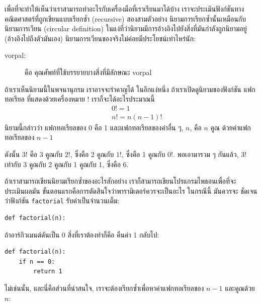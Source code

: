 เพื่อที่จะทำให้เห็นว่าเราสามารถทำอะไรกับเครื่องมือที่เราเรียนมาได้บ้าง เราจะประเมินฟังก์ชันทาง
คณิตศาสตร์ที่ถูกเขียนแบบเรียกซ้ำ (recursive) สองสามตัวอย่าง นิยามการเรียกซ้ำนั้นเหมือนกับ
นิยามการเวียน (circular definition) ในแง่ที่ว่านิยามมีการอ้างอิงไปยังสิ่งที่มันกำลังถูกนิยามอยู่ 
(อ้างอิงไปถึงตัวมันเอง)  นิยามการเวียนของจริงไม่ค่อยมีประโยชน์เท่าไหร่นัก:

\begin{description}

\item[vorpal:] คือ คุณศัพท์ที่ใช้บรรยายบางสิ่งที่มีลักษณะ vorpal 

\end{description}

ถ้าเราเห็นนิยามนี้ในพจนานุกรม เราอาจจะรำคาญได้  ในอีกแง่หนึ่ง ถ้าเราเปิดดูนิยามของฟังก์ชัน
แฟกทอเรียล ที่แสดงด้วยเครื่องหมาย $!$ เราก็จะได้อะไรประมาณนี้
%
\begin{eqnarray*}
&&  0! = 1 \\
&&  n! = n (n-1)!
\end{eqnarray*}
%
นิยามนี้กล่าวว่า แฟกทอเรียลของ 0 คือ 1 และแฟกทอเรียลของค่าอื่น ๆ, $n$, คือ $n$ คูณ
ด้วยค่าแฟกทอเรียลของ $n-1$

ดังนั้น $3!$ คือ 3 คูณกับ $2!$, ซึ่งคือ 2 คูณกับ $1!$, ซึ่งคือ 1 คูณกับ
$0!$. พอเอามารวม ๆ กันแล้ว, $3!$ เท่ากับ 3 คูณกับ 2 คูณกับ 1 คูณกับ 1,
ซึ่งคือ 6.

ถ้าเราสามารถเขียนนิยามเรียกซ้ำของอะไรสักอย่าง เราก็สามารถเขียนโปรแกรมไพธอนเพื่อที่จะ
ประเมินผลมัน ขั้นตอนแรกคือการตัดสินใจว่าพารามิเตอร์ควรจะเป็นอะไร ในกรณีนี้ มันควรจะ
ชัดเจนว่าฟังก์ชัน {\tt factorial} รับค่าเป็นจำนวนเต็ม:

\begin{verbatim}
def factorial(n):
\end{verbatim}
%
ถ้าอาร์กิวเมนต์ดันเป็น 0 สิ่งที่เราต้องทำก็คือ คืนค่า 1 กลับไป:

\begin{verbatim}
def factorial(n):
    if n == 0:
        return 1
\end{verbatim}
%
ไม่เช่นนั้น, และนี่คือส่วนที่น่าสนใจ, เราจะต้องเรียกซ้ำเพื่อหาค่าแฟกทอเรียลของ $n-1$ 
และคูณด้วย $n$:

